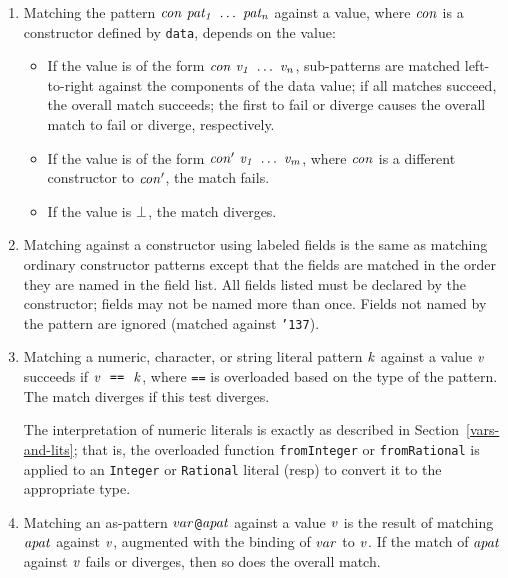 \begin{enumerate}
\item
Matching the pattern \mbox{$\it con\ pat_1\ \ldots\ pat_n$} against a value, where \mbox{$\it con$} is a
constructor defined by \mbox{\tt data}, depends on the value:
\begin{itemize}
\item If the value is of the form \mbox{$\it con\ v_1\ \ldots\ v_n$}, 
sub-patterns are matched left-to-right against the components of the data value;
if all matches succeed, the overall match
succeeds; the first to fail or diverge causes the overall match to
fail or diverge, respectively.  

\item If the value is of the form \mbox{$\it con'\ v_1\ \ldots\ v_m$}, where \mbox{$\it con$} is a different 
constructor to \mbox{$\it con'$}, the match fails.

\item If the value is \mbox{$\it \bot$}, the match diverges.
\end{itemize}

\item 
Matching against a constructor using labeled fields is the same as
matching ordinary constructor patterns except that the fields are
matched in the order they are named in the field list.  All fields
listed must be declared by the constructor; fields may not be named
more than once.  Fields not named by the pattern are ignored (matched
against \mbox{\tt {\char'137}}).

\item Matching a numeric, character, or string literal pattern \mbox{$\it k$} against a value \mbox{$\it v$}
succeeds if \mbox{$\it v\ ~\makebox{\tt ==}\ ~k$}, where \mbox{\tt ==}
is overloaded based on the type of the pattern.  The match diverges if
this test diverges.

The interpretation of numeric literals is exactly as described in Section~\ref{vars-and-lits};
that is, the overloaded function \mbox{\tt fromInteger} or \mbox{\tt fromRational} is 
applied to an \mbox{\tt Integer} or \mbox{\tt Rational} literal (resp)
to convert it to the appropriate type.

\item
Matching an as-pattern \mbox{$\it var$}{\tt @}\mbox{$\it apat$} against a value \mbox{$\it v$} is
the result of matching \mbox{$\it apat$} against \mbox{$\it v$}, augmented with the binding of
\mbox{$\it var$} to \mbox{$\it v$}.  If the match of \mbox{$\it apat$} against \mbox{$\it v$} fails or diverges,
then so does the overall match.
\end{enumerate}

